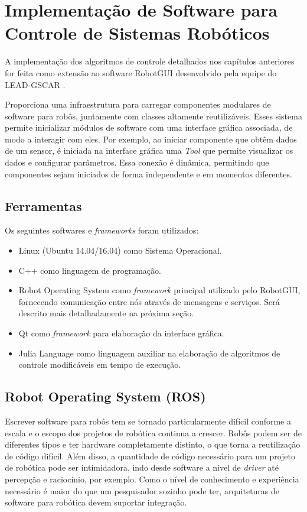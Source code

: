 \chapter{Implementação de Software para Controle de Sistemas Robóticos}
A implementação dos algoritmos de controle detalhados nos capítulos anteriores for feita como extensão ao software RobotGUI desenvolvido pela equipe do LEAD-GSCAR \citep{nunes2013doris}.

Proporciona uma infraestrutura para carregar componentes modulares de software para robôs, juntamente com classes altamente reutilizáveis. Esses sistema permite inicializar módulos de software com uma interface gráfica associada, de modo a interagir com eles. Por exemplo, ao iniciar componente que obtêm dados de um sensor, é iniciada na interface gráfica uma \textit{Tool} que permite visualizar os dados e configurar parâmetros. Essa conexão é dinâmica, permitindo que componentes sejam iniciados de forma independente e em momentos diferentes.  


\section{Ferramentas}
Os seguintes softwares e \textit{frameworks} foram utilizados:

\begin{itemize}
\item Linux (Ubuntu 14.04/16.04) como Sistema Operacional.
\item C++ como linguagem de programação.
\item Robot Operating System \citep{quigley2009ros} como \textit{framework} principal utilizado pelo RobotGUI, fornecendo comunicação entre nós através de mensagens e serviços. Será descrito mais detalhadamente na próxima seção.
\item Qt \citep{qtcompany} como \textit{framework} para elaboração da interface gráfica. 
\item Julia Language como linguagem auxiliar na elaboração de algoritmos de controle modificáveis em tempo de execução.
\end{itemize}

\section{Robot Operating System (ROS)}
Escrever software para robôs tem se tornado particularmente difícil conforme a escala e o escopo dos projetos de robótica continua a crescer. Robôs podem ser de diferentes tipos e ter hardware completamente distinto, o que torna a reutilização de código difícil. Além disso, a quantidade de código necessário para um projeto de robótica pode ser intimidadora, indo desde software a nível de \textit{driver} até percepção e raciocínio, por exemplo. Como o nível de conhecimento e experiência necessário é maior do que um pesquisador sozinho pode ter, arquiteturas de software para robótica devem suportar integração. 

